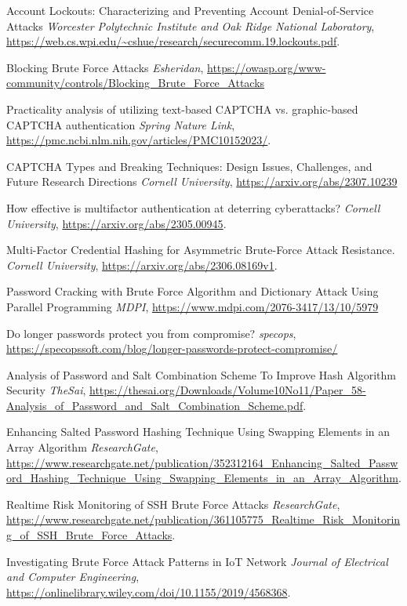\documentclass{comjnl}
\begin{document}
\begin{thebibliography}{99}

   Account Lockouts: Characterizing and Preventing Account Denial-of-Service Attacks
  \textit{Worcester Polytechnic Institute and Oak Ridge National Laboratory}, \url{https://web.cs.wpi.edu/~cshue/research/securecomm.19.lockouts.pdf}.

   Blocking Brute Force Attacks
  \textit{Esheridan}, \url{https://owasp.org/www-community/controls/Blocking_Brute_Force_Attacks}


   Practicality analysis of utilizing text-based CAPTCHA vs. graphic-based CAPTCHA authentication
  \textit{Spring Nature Link}, \url{https://pmc.ncbi.nlm.nih.gov/articles/PMC10152023/}.

   CAPTCHA Types and Breaking Techniques: Design Issues, Challenges, and Future Research Directions
  \textit{Cornell University}, \url{https://arxiv.org/abs/2307.10239}
  

   How effective is multifactor authentication at deterring cyberattacks? 
  \textit{Cornell University}, \url{https://arxiv.org/abs/2305.00945}.
  
   Multi-Factor Credential Hashing for Asymmetric Brute-Force Attack Resistance.
  \textit{Cornell University}, \url{https://arxiv.org/abs/2306.08169v1}.

   Password Cracking with Brute Force Algorithm and Dictionary Attack Using Parallel Programming
  \textit{MDPI}, \url {https://www.mdpi.com/2076-3417/13/10/5979}

   Do longer passwords protect you from compromise?
  \textit{specops}, \url {https://specopssoft.com/blog/longer-passwords-protect-compromise/}

   Analysis of Password and Salt Combination Scheme To Improve Hash Algorithm Security
  \textit{TheSai}, \url{https://thesai.org/Downloads/Volume10No11/Paper_58-Analysis_of_Password_and_Salt_Combination_Scheme.pdf}.

   Enhancing Salted Password Hashing Technique Using Swapping Elements in an Array Algorithm
  \textit{ResearchGate}, \url{https://www.researchgate.net/publication/352312164_Enhancing_Salted_Password_Hashing_Technique_Using_Swapping_Elements_in_an_Array_Algorithm}.
  
   Realtime Risk Monitoring of SSH Brute Force Attacks
  \textit{ResearchGate}, \url{https://www.researchgate.net/publication/361105775_Realtime_Risk_Monitoring_of_SSH_Brute_Force_Attacks}.

   Investigating Brute Force Attack Patterns in IoT Network
  \textit{Journal of Electrical and Computer Engineering}, \url{https://onlinelibrary.wiley.com/doi/10.1155/2019/4568368}.
  

\end{thebibliography}




\end{document}
